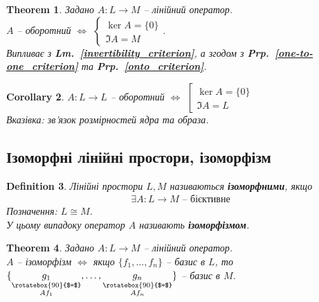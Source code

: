 \documentclass[a4paper, 10pt]{article}
\theoremstyle{theoremdd}
\newtheorem{theorem}{Theorem}[subsection]
\newtheorem{definition}[theorem]{Definition}
\newtheorem{corollary}[theorem]{Corollary}
\newcommand\prpref[1]{\textbf{Prp.~\ref{#1}}}
\newcommand\lmref[1]{\textbf{Lm.~\ref{#1}}}
\begin{document}
	\begin{theorem}
	Задано $A \colon L \to M$ -- лінійний оператор.\\
	$A$ -- оборотний $\iff$ $\begin{cases} \ker A = \{0\} \\ \Im A = M \end{cases}$.\\
	\textit{Випливає з \lmref{invertibility_criterion}, а згодом з \prpref{one-to-one_criterion} та \prpref{onto_criterion}.}
	\end{theorem}
	
	\begin{corollary}
	$A \colon L \to L$ -- оборотний $\iff$ $\left[ \begin{gathered} \ker A = \{0\} \\ \Im A = L \end{gathered} \right.$\\
	\textit{Вказівка: зв'язок розмірностей ядра та образа}.
	\end{corollary}
	
	\subsection{Ізоморфні лінійні простори, ізоморфізм}
	\begin{definition}
	Лінійні простори $L,M$ називаються \textbf{ізоморфними}, якщо
	\begin{align*}
	\exists A \colon L \to M \text{ -- бієктивне}
	\end{align*}
	Позначення: $L \cong M$.\\
	У цьому випадоку оператор $A$ називають \textbf{ізоморфізмом}.
	\end{definition}
	
	\begin{theorem}
	Задано $A \colon L \to M$ -- лінійний оператор.\\
	$A$ -- ізоморфізм $\iff$ якщо $\{f_1,\dots,f_n\}$ -- базис в $L$, то $\{\underset{\substack{\rotatebox{90}{$=$} \\ Af_1}}{g_1},\dots, \underset{\substack{\rotatebox{90}{$=$} \\ Af_n}}{g_n}\}$ -- базис в $M$.
	\end{theorem}
	
\end{document}
